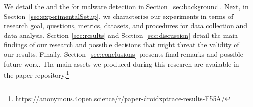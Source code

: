 We detail the \mas and the \mas for malware detection in
Section~\ref{sec:background}. Next, in Section~\ref{sec:experimentalSetup}, we
characterize our experiments in terms of research goal, questions, metrics, datasets, 
and procedures for data collection and data analysis. Section~\ref{sec:results} and
Section~\ref{sec:discussion} detail the main findings of our research and
possible decisions that might threat the validity of our results. Finally,
Section~\ref{sec:conclusions} presents final remarks and possible future
work. The main assets we produced during this research are available in the
paper repository.\footnote{\url{https://anonymous.4open.science/r/paper-droidxptrace-results-F55A/}}

